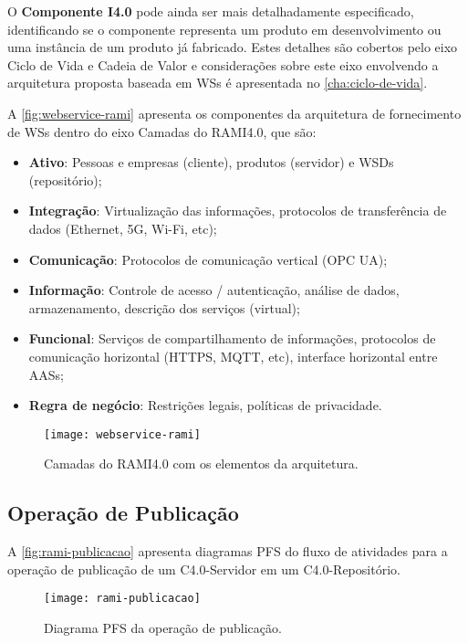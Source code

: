 	O \textbf{Componente I4.0} pode ainda ser mais detalhadamente especificado, identificando se o componente representa um produto em desenvolvimento ou uma instância de um produto já fabricado. Estes detalhes são cobertos pelo eixo Ciclo de Vida e Cadeia de Valor e considerações sobre este eixo envolvendo a arquitetura proposta baseada em WSs é apresentada no \autoref{cha:ciclo-de-vida}.
	
	A \autoref{fig:webservice-rami} apresenta os componentes da arquitetura de fornecimento de WSs dentro do eixo Camadas do RAMI4.0, que são:
	
	\begin{itemize}
		\item \textbf{Ativo}: Pessoas e empresas (cliente), produtos (servidor) e WSDs (repositório); 
		\item \textbf{Integração}: Virtualização das informações, protocolos de transferência de dados (Ethernet, 5G, Wi-Fi, etc); 
		\item \textbf{Comunicação}: Protocolos de comunicação vertical (OPC UA); 
		\item \textbf{Informação}: Controle de acesso / autenticação, análise de dados, armazenamento, descrição dos serviços (virtual);
		\item \textbf{Funcional}: Serviços de compartilhamento de informações, protocolos de comunicação horizontal (HTTPS, MQTT, etc), interface horizontal entre AASs; 
		\item \textbf{Regra de negócio}: Restrições legais, políticas de privacidade.
	\end{itemize}
	
	\begin{figure}[H]
		\centering
		\caption{Camadas do RAMI4.0 com os elementos da arquitetura.}
		\label{fig:webservice-rami}
		\texttt{[image: webservice-rami]}
	\end{figure}

\subsection{Operação de Publicação}

	A \autoref{fig:rami-publicacao} apresenta diagramas PFS do fluxo de atividades para a operação de publicação de um C4.0-Servidor em um C4.0-Repositório.
	
	\begin{figure}[htb]
		\centering
		\caption{Diagrama PFS da operação de publicação.}
		\label{fig:rami-publicacao}
		\texttt{[image: rami-publicacao]}
	\end{figure}

